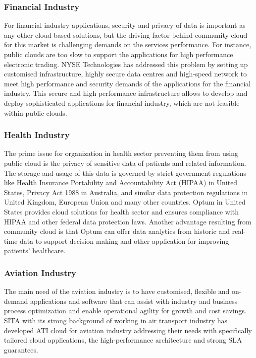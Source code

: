\subsubsection{Financial Industry}
For financial industry applications, security and privacy of data is important as any other cloud-based solutions, but the driving factor behind community cloud for this market is challenging demands on the services performance.
For instance, public clouds are too slow to support the applications for high performance electronic trading.
NYSE Technologies has addressed this problem by setting up customised infrastructure, highly secure data centres and high-speed network to meet high performance and security demands of the applications for the financial industry. %
This secure and high performance infrastructure allows to develop and deploy sophisticated applications for financial industry, which are not feasible within public clouds.

\subsubsection{Health Industry}
The prime issue for organization in health sector preventing them from using public cloud is the privacy of sensitive data of patients and related information.
The storage and usage of this data is governed by strict government regulations like Health Insurance Portability and Accountability Act (HIPAA) in United States, Privacy Act 1988 in Australia, and similar data protection regulations in United Kingdom, European Union and many other countries.
Optum in United States provides cloud solutions for health sector and ensures compliance with HIPAA and other federal data protection laws. 
Another advantage resulting from community cloud is that Optum can offer data analytics from historic and real-time data to support decision making and other application for improving patients' healthcare.

\subsubsection{Aviation Industry}
The main need of the aviation industry is to have customised, flexible and on-demand applications and software that can assist with industry and business process optimization and enable operational agility for growth and cost savings.
SITA with its strong background of working in air transport industry has developed ATI cloud for aviation industry addressing their needs with specifically tailored cloud applications, the high-performance architecture and strong SLA guarantees. 

